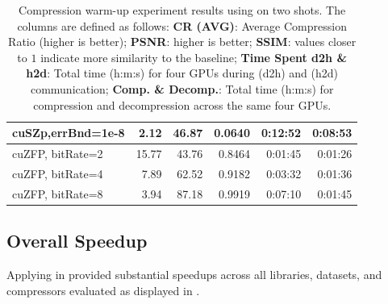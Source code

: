 \documentclass[Ingles,Final]{ic-tese-v3}
\begin{document}
\begin{table}[h!]
\begin{tabular}{|lrrrrr|}
\multicolumn{1}{|l|}{cuSZp,errBnd=1e-8} &
  \multicolumn{1}{r|}{2.12} &
  \multicolumn{1}{r|}{46.87} &
  \multicolumn{1}{r|}{0.0640} &
  \multicolumn{1}{r|}{0:12:52} &
  0:08:53 \\ \hline
\multicolumn{1}{|l|}{cuZFP, bitRate=2} &
  \multicolumn{1}{r|}{15.77} &
  \multicolumn{1}{r|}{43.76} &
  \multicolumn{1}{r|}{0.8464} &
  \multicolumn{1}{r|}{0:01:45} &
  0:01:26 \\ \hline
\multicolumn{1}{|l|}{cuZFP, bitRate=4} &
  \multicolumn{1}{r|}{7.89} &
  \multicolumn{1}{r|}{62.52} &
  \multicolumn{1}{r|}{0.9182} &
  \multicolumn{1}{r|}{0:03:32} &
  0:01:36 \\ \hline
\multicolumn{1}{|l|}{cuZFP, bitRate=8} &
  \multicolumn{1}{r|}{3.94} &
  \multicolumn{1}{r|}{87.18} &
  \multicolumn{1}{r|}{0.9919} &
  \multicolumn{1}{r|}{0:07:10} &
  0:01:45 \\ \hline
\end{tabular}
\caption[Compression warm-up experiments results]{Compression warm-up experiment results using \awave on two shots. The columns are defined as follows: \textbf{CR (AVG)}: Average Compression Ratio (higher is better); \textbf{PSNR}: higher is better; \textbf{SSIM}: values closer to $1$ indicate more similarity to the baseline; \textbf{Time Spent d2h \& h2d}: Total time (h:m:s) for four GPUs during \dth (d2h) and \htd (h2d) communication; \textbf{Comp. \& Decomp.}: Total time (h:m:s) for compression and decompression across the same four GPUs.}
\label{tab:warmup}
\end{table}


\subsection{Overall Speedup}
\label{sec:comp_speedup}

Applying \compression in \awave provided substantial speedups across all \checkpointing libraries, datasets, and compressors evaluated as displayed in .
\end{document}
